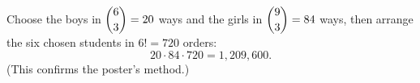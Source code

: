 Choose the boys in $\dbinom63=20$ ways and the girls in $\dbinom93=84$ ways, then arrange the six chosen students in $6!=720$ orders:
\[20\cdot84\cdot720=\boxed{1{,}209{,}600}.\]
(This confirms the poster's method.)
